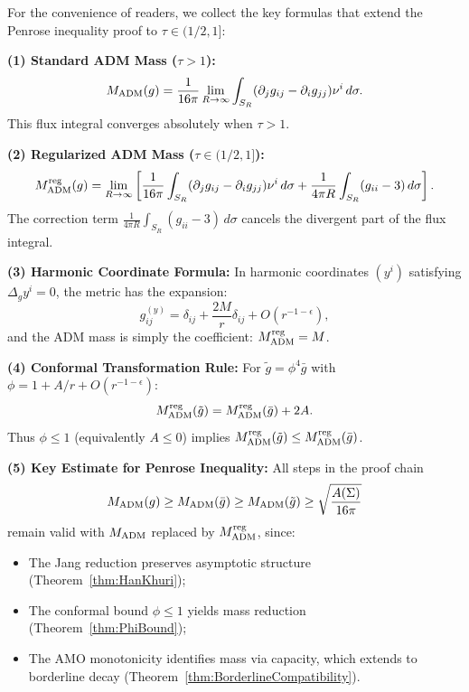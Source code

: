 \begin{remark}\label{rem:BorderlineMassSummary}
For the convenience of readers, we collect the key formulas that extend the Penrose inequality proof to $\tau \in (1/2, 1]$:

\textbf{(1) Standard ADM Mass ($\tau > 1$):}
\begin{equation}
    M_{\mathrm{ADM}}(g) = \frac{1}{16\pi} \lim_{R \to \infty} \int_{S_R} (\partial_j g_{ij} - \partial_i g_{jj}) \nu^i \, d\sigma.
\end{equation}
This flux integral converges absolutely when $\tau > 1$.

\textbf{(2) Regularized ADM Mass ($\tau \in (1/2, 1]$):}
\begin{equation}\label{eq:RegADM}
    M_{\mathrm{ADM}}^{\mathrm{reg}}(g) = \lim_{R \to \infty} \left[ \frac{1}{16\pi} \int_{S_R} (\partial_j g_{ij} - \partial_i g_{jj}) \nu^i \, d\sigma + \frac{1}{4\pi R} \int_{S_R} (g_{ii} - 3) \, d\sigma \right].
\end{equation}
The correction term $\frac{1}{4\pi R} \int_{S_R} (g_{ii} - 3) \, d\sigma$ cancels the divergent part of the flux integral.

\textbf{(3) Harmonic Coordinate Formula:}
In harmonic coordinates $(y^i)$ satisfying $\Delta_g y^i = 0$, the metric has the expansion:
\begin{equation}
    g_{ij}^{(y)} = \delta_{ij} + \frac{2M}{r} \delta_{ij} + O(r^{-1-\epsilon}),
\end{equation}
and the ADM mass is simply the coefficient: $M_{\mathrm{ADM}}^{\mathrm{reg}} = M$.

\textbf{(4) Conformal Transformation Rule:}
For $\tilde{g} = \phi^4 \bar{g}$ with $\phi = 1 + A/r + O(r^{-1-\epsilon})$:
\begin{equation}
    M_{\mathrm{ADM}}^{\mathrm{reg}}(\tilde{g}) = M_{\mathrm{ADM}}^{\mathrm{reg}}(\bar{g}) + 2A.
\end{equation}
Thus $\phi \le 1$ (equivalently $A \le 0$) implies $M_{\mathrm{ADM}}^{\mathrm{reg}}(\tilde{g}) \le M_{\mathrm{ADM}}^{\mathrm{reg}}(\bar{g})$.

\textbf{(5) Key Estimate for Penrose Inequality:}
All steps in the proof chain
\begin{equation}
    M_{\mathrm{ADM}}(g) \ge M_{\mathrm{ADM}}(\bar{g}) \ge M_{\mathrm{ADM}}(\tilde{g}) \ge \sqrt{\frac{A(\Sigma)}{16\pi}}
\end{equation}
remain valid with $M_{\mathrm{ADM}}$ replaced by $M_{\mathrm{ADM}}^{\mathrm{reg}}$, since:
\begin{itemize}
    \item The Jang reduction preserves asymptotic structure (Theorem~\ref{thm:HanKhuri});
    \item The conformal bound $\phi \le 1$ yields mass reduction (Theorem~\ref{thm:PhiBound});
    \item The AMO monotonicity identifies mass via capacity, which extends to borderline decay (Theorem~\ref{thm:BorderlineCompatibility}).
\end{itemize}
\end{remark}

